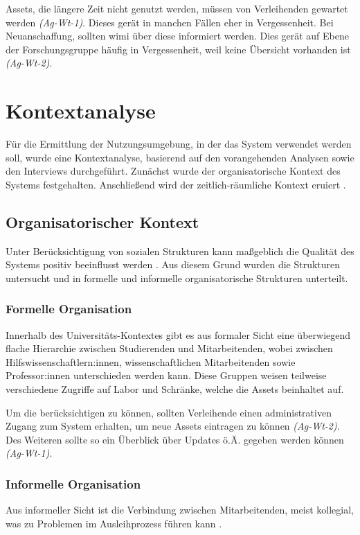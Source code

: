 Assets, die längere Zeit nicht genutzt werden, müssen von Verleihenden gewartet werden \textit{(Ag-Wt-1)}. Dieses gerät
in manchen Fällen eher in Vergessenheit. Bei Neuanschaffung, sollten \ac{wimi} über diese informiert werden. Dies gerät auf Ebene der
Forschungsgruppe häufig in Vergessenheit, weil keine Übersicht vorhanden ist \textit{(Ag-Wt-2)}.



\section{Kontextanalyse}
\label{section:kontext}

Für die Ermittlung der Nutzungsumgebung, in der das System verwendet werden soll, wurde eine
Kontextanalyse, basierend auf den vorangehenden Analysen sowie den Interviews durchgeführt. Zunächst
wurde der organisatorische Kontext des Systems festgehalten. Anschließend wird der
zeitlich-räumliche Kontext eruiert \cite{herczeg_software-ergonomie_2018}.

\subsection{Organisatorischer Kontext}
Unter Berücksichtigung von sozialen Strukturen kann maßgeblich die Qualität des Systems positiv
beeinflusst werden \cite{herczeg_software-ergonomie_2018}. Aus diesem Grund wurden die Strukturen untersucht
und in formelle und informelle organisatorische Strukturen unterteilt.

\subsubsection{Formelle Organisation}
Innerhalb des Universitäts-Kontextes gibt es aus formaler Sicht eine überwiegend flache Hierarchie
zwischen Studierenden und Mitarbeitenden, wobei zwischen Hilfswissenschaftlern:innen,
wissenschaftlichen Mitarbeitenden sowie Professor:innen unterschieden werden kann. Diese Gruppen
weisen teilweise verschiedene Zugriffe auf Labor und Schränke, welche die Assets
beinhaltet auf.

Um die  berücksichtigen zu können, sollten Verleihende einen administrativen
Zugang zum System erhalten, um neue Assets eintragen zu können \textit{(Ag-Wt-2)}. Des Weiteren
sollte so ein Überblick über Updates ö.Ä. gegeben werden können \textit{(Ag-Wt-1)}.

\subsubsection{Informelle Organisation}
Aus informeller Sicht ist die Verbindung zwischen Mitarbeitenden, meist kollegial, was zu Problemen
im Ausleihprozess führen kann .

